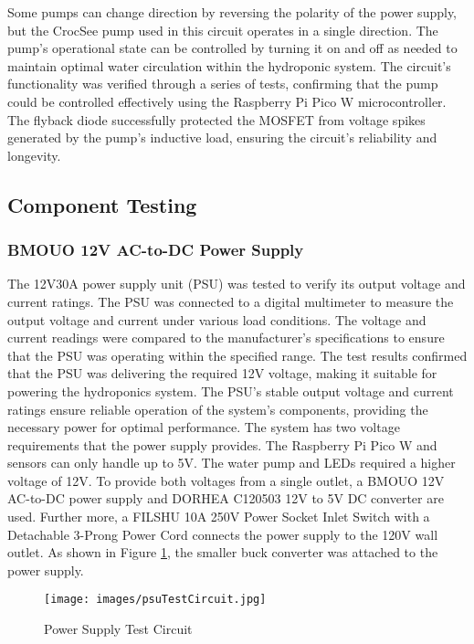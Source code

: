 \documentclass[12pt]{article} %
\begin{document}
\newline
\newline
\noindent Some pumps can change direction by reversing the polarity of the power supply, but the CrocSee pump used in this circuit operates in a single direction. The pump's operational state can be controlled by turning it on and off as needed to maintain optimal water circulation within the hydroponic system. The circuit's functionality was verified through a series of tests, confirming that the pump could be controlled effectively using the Raspberry Pi Pico W microcontroller. The flyback diode successfully protected the MOSFET from voltage spikes generated by the pump's inductive load, ensuring the circuit's reliability and longevity.

\subsection{Component Testing}
\subsubsection{BMOUO 12V AC-to-DC Power Supply}
\noindent The 12V30A power supply unit (PSU) was tested to verify its output voltage and current ratings. The PSU was connected to a digital multimeter to measure the output voltage and current under various load conditions. The voltage and current readings were compared to the manufacturer's specifications to ensure that the PSU was operating within the specified range. The test results confirmed that the PSU was delivering the required 12V voltage, making it suitable for powering the hydroponics system. The PSU's stable output voltage and current ratings ensure reliable operation of the system's components, providing the necessary power for optimal performance.
\noindent The system has two voltage requirements that the power supply provides. The Raspberry Pi Pico W and sensors can only handle up to 5V. The water pump and LEDs required a higher voltage of 12V. To provide both voltages from a single outlet, a BMOUO 12V AC-to-DC power supply and DORHEA C120503 12V to 5V DC converter are used. Further more, a FILSHU 10A 250V Power Socket Inlet Switch with a Detachable 3-Prong Power Cord connects the power supply to the 120V wall outlet. As shown in Figure \ref{fig:PSU test Circuit}, the smaller buck converter was attached to the power supply. 

\begin{figure}[H]
  \centering
  \texttt{[image: images/psuTestCircuit.jpg]}
  \caption{Power Supply Test Circuit}
  \label{fig:PSU test Circuit}
\end{figure}
\end{document}
